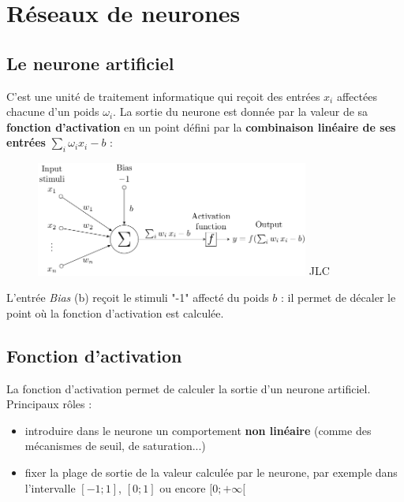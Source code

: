 \documentclass{article}
\begin{document}
\section{Réseaux de neurones}

\subsection{Le neurone artificiel}

C'est une unité de traitement informatique qui reçoit des entrées $x_i$ affectées chacune d'un poids $\omega_i$. 
La sortie du neurone est donnée par la valeur de sa \textbf{fonction d'activation} en un point défini par la 
\textbf{combinaison linéaire de ses entrées} $\sum_i \omega_i x_i - b$ :

\begin{figure}[H]
\centering
\includegraphics[width=0.8\textwidth]{img/nn_1.png}
JLC
\end{figure}


L'entrée \textit{Bias} (b) reçoit le stimuli "-1" affecté du poids $b$ : 
il permet de décaler le point où la fonction d'activation est calculée. 

\subsection{Fonction d'activation}

La fonction d'activation permet de calculer la sortie d'un neurone artificiel.\\

Principaux rôles :

\begin{itemize}
\item introduire dans le neurone un comportement \textbf{non linéaire} (comme des mécanismes de seuil, de saturation...)
\item fixer la plage de sortie de la valeur calculée par le neurone, par exemple dans l'intervalle $[-1 ; 1]$, $[0 ; 1]$ ou encore $[0 ; +\infty[$
\end{itemize}
\end{document}
